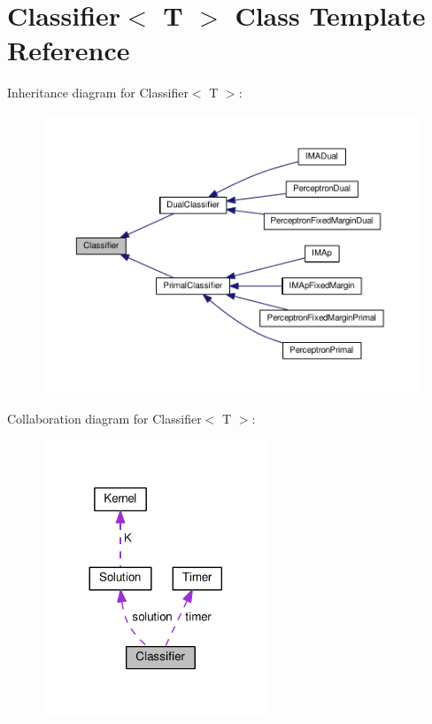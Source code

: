 \hypertarget{class_classifier}{}\section{Classifier$<$ T $>$ Class Template Reference}
\label{class_classifier}


Inheritance diagram for Classifier$<$ T $>$\+:\nopagebreak
\begin{figure}[H]
\begin{center}
\leavevmode
\includegraphics[width=350pt]{class_classifier__inherit__graph}
\end{center}
\end{figure}


Collaboration diagram for Classifier$<$ T $>$\+:\nopagebreak
\begin{figure}[H]
\begin{center}
\leavevmode
\includegraphics[width=192pt]{class_classifier__coll__graph}
\end{center}
\end{figure}
